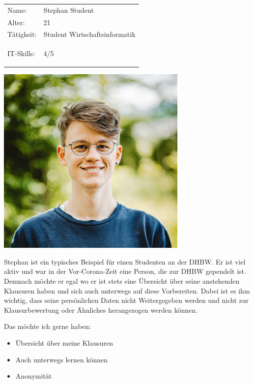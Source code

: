 \begin{minipage}[t]{0.5\textwidth}
	\vspace{-4cm}
	\renewcommand{\arraystretch}{1.5}
	\begin{tabular}{l l}
		Name: & Stephan Student \\
		Alter: & 21 \\
		Tätigkeit: & Student Wirtschaftsinformatik \\
		IT-Skills: & 4/5 \hspace{-1cm} \begin{barchart}{5.0}
			\baritemNL{}{4}
		\end{barchart} \\
	\end{tabular}
\end{minipage}
\hfill
\begin{minipage}[t]{0.4\textwidth}
	\flushright
	\includegraphics[width=0.70\textwidth]{img/carlos-lindner-ZVo7vtXilCs-unsplash.jpg}
\end{minipage}


Stephan ist ein typisches Beispiel für einen Studenten an der DHBW.
Er ist viel aktiv und war in der Vor-Corona-Zeit eine Person, die zur DHBW gependelt ist.
Demnach möchte er egal wo er ist stets eine Übersicht über seine anstehenden Klausuren haben und sich auch unterwegs auf diese Vorbereiten.
Dabei ist es ihm wichtig, dass seine persönlichen Daten nicht Weitergegeben werden und nicht zur Klausurbewertung oder Ähnliches herangezogen werden können.

Das möchte ich gerne haben:
\begin{itemize}
	\item Übersicht über meine Klausuren
	\item Auch unterwegs lernen können
	\item Anonymität
\end{itemize}


